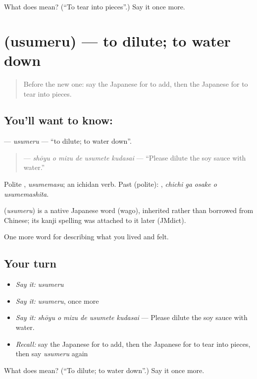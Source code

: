 \begin{tcolorbox}[breakable,colback=teal!4,colframe=teal!35!black,title={Before you move on}]
What does  mean? (\textquotedblleft{}To tear into pieces\textquotedblright{}.) Say it once more.
\end{tcolorbox}
\section[\texorpdfstring{\ja{うすめる} (usumeru)}{うすめる (usumeru)}]{ (usumeru) — to dilute; to water down}

\label{lesson:JA-C474-usumeru}



\begin{quote}
Before the new one: say the Japanese for to add, then the Japanese for to tear into pieces.
\end{quote}

\subsection*{You'll want to know: }
\textbf{} — \emph{usumeru} — \textquotedblleft{}to dilute; to water down\textquotedblright{}.

\begin{quote}
\textbf{   } — \emph{shōyu o mizu de usumete kudasai} — \textquotedblleft{}Please dilute the soy sauce with water.\textquotedblright{}
\end{quote}

Polite \textbf{}, \emph{usumemasu}; an ichidan verb. Past (polite): \textbf{  }, \emph{chichi ga osake o usumemashita}.

\begin{cousinweb}
\textbf{} (\emph{usumeru}) is a native Japanese word (wago), inherited rather than borrowed from Chinese; its kanji spelling was attached to it later (JMdict).
\end{cousinweb}

\begin{grammarlens}[title={What you've built}]
One more word for describing what you lived and felt.
\end{grammarlens}

\subsection*{Your turn}
\begin{itemize}
\raggedright
  \item \emph{Say it:} \emph{usumeru}
  \item \emph{Say it:} \emph{usumeru}, once more
  \item \emph{Say it:} \emph{shōyu o mizu de usumete kudasai} — Please dilute the soy sauce with water.
  \item \emph{Recall:} say the Japanese for to add, then the Japanese for to tear into pieces, then say \emph{usumeru} again
\end{itemize}

\begin{tcolorbox}[breakable,colback=teal!4,colframe=teal!35!black,title={Before you move on}]
What does  mean? (\textquotedblleft{}To dilute; to water down\textquotedblright{}.) Say it once more.
\end{tcolorbox}
